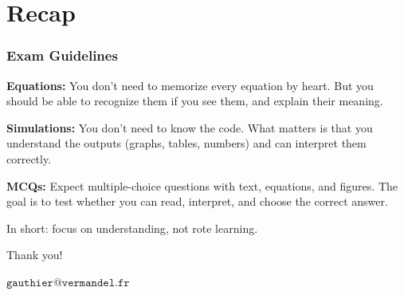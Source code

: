 \documentclass[xcolor=x11names,compress,aspectratio=169]{beamer}%
\makeatletter
\newenvironment{stepitemizewithalert}{\begin{itemize}[<+-| alert@+>]}{\end{itemize} }
\renewenvironment{itemize}{\begin{compactitemize}[<+-| alert@+>]}{\end{compactitemize}}
\renewenvironment{stepitemizewithalert}{\begin{compactitemize}[<+-| alert@+>]}{\end{compactitemize}}
\renewenvironment{stepitemizewithalert}{\begin{itemize}}{\end{itemize}}
\makeatother
\begin{document}
\section{Recap}%

\begin{frame}%
%

\frametitle{Exam Guidelines}%


\begin{stepitemizewithalert}
\item \textbf{Equations:} You don't need to memorize every equation by heart.
But you should be able to recognize them if you see them, and explain their meaning.

\item \textbf{Simulations:} You don't need to know the code. What matters is
that you understand the outputs (graphs, tables, numbers) and can interpret
them correctly.

\item \textbf{MCQs:} Expect multiple-choice questions with text, equations,
and figures. The goal is to test whether you can read, interpret, and choose
the correct answer.
\end{stepitemizewithalert}

In short: focus on understanding, not rote learning.

%

\transboxout
\end{frame}%
%

\begin{frame}%


\begin{center}
Thank you!

\vspace{5ex}

$\mathtt{gauthier@vermandel.fr}$
\end{center}

%

\transboxout
\end{frame}%
%


%
\end{document}
